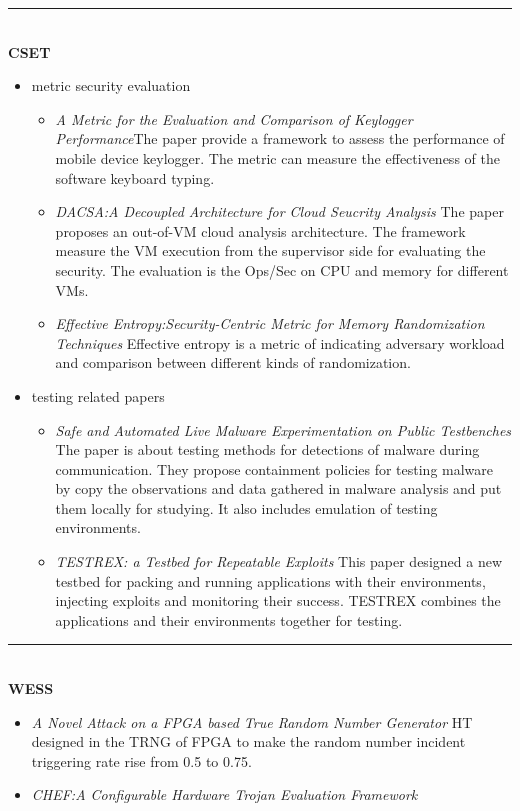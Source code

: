 \documentclass[]{article}
\begin{document}
\rule[-0.1cm]{7.5in}{0.01cm}\\
\noindent \textbf{CSET}
\begin{itemize}
	\item metric security evaluation
	\begin{itemize}
		\item \textit{A Metric for the Evaluation and Comparison of Keylogger
		Performance}The paper provide a framework to assess the performance of
		mobile device keylogger.  The metric can measure the effectiveness of
		the software keyboard typing.
		\item \textit{DACSA:A Decoupled Architecture for Cloud Seucrity
		Analysis} The paper proposes an out-of-VM cloud analysis architecture.
		The framework measure the VM execution from the supervisor side for
		evaluating the security. The evaluation is the Ops/Sec on CPU and memory
		for different VMs.
		\item \textit{Effective Entropy:Security-Centric Metric for Memory
		Randomization Techniques} Effective entropy is a metric of indicating
		adversary workload and comparison between different kinds of
		randomization.
	\end{itemize}
	\item testing related papers 
	\begin{itemize}
		\item \textit{Safe and Automated Live Malware Experimentation on Public
		Testbenches} The paper is about testing methods for detections of
		malware during communication. They propose containment policies for
		testing malware by copy the observations and data gathered in malware
		analysis and put them locally for studying. It also includes emulation
		of testing environments.
		\item \textit{TESTREX: a Testbed for Repeatable Exploits} This paper
		designed a new testbed for packing and running applications with their
		environments, injecting exploits and monitoring their success. TESTREX
		combines the applications and their environments together for testing.
	\end{itemize}
\end{itemize}

\rule[-0.1cm]{7.5in}{0.01cm}\\
\noindent \textbf{WESS}
\begin{itemize}	
	\item \textit{A Novel Attack on a FPGA based True Random Number Generator}
	HT designed in the TRNG of FPGA to make the random number incident
	triggering rate rise from 0.5 to 0.75.
	\item \textit{CHEF:A Configurable Hardware Trojan Evaluation Framework}
\end{itemize}
\end{document}
